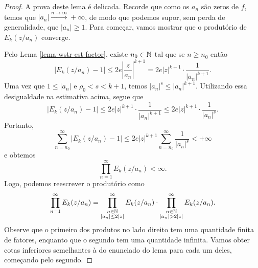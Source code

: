     \begin{proof}
        A prova deste lema é delicada. Recorde que como os $a_n$ são
        zeros de $f$, temos que $|a_n| \xrightarrow{n\to\infty} +\infty$,
        de modo que podemos supor, sem perda de generalidade, que $|a_n| \geq 1$.
        Para começar, vamos mostrar que o produtório de $E_k(z/a_n)$ converge.
        
        Pelo Lema \ref{lema-wstr-est-factor}, existe $n_0\in\mathbb{N}$ tal que se $n\geq n_0$
        então
        \begin{equation*}
            \left| E_k(z/a_n) - 1 \right| 
            \leq 2e\left| \frac{z}{a_n} \right|^{k+1}
            = 2e|z|^{k+1}\cdot\frac{1}{|a_n|^{k+1}}.
        \end{equation*}
        Uma vez que $1 \leq |a_n|$ e $\rho_0 < s < k+1$, temos 
        $|a_n|^s \leq |a_n|^{k+1}$. Utilizando essa desigualdade na estimativa acima,
        segue que
        \begin{equation*}
            \left| E_k(z/a_n) - 1 \right|
            \leq 2e|z|^{k+1}\cdot\frac{1}{|a_n|^{k+1}}
            \leq 2e|z|^{k+1}\cdot\frac{1}{|a_n|^s}.
        \end{equation*}
        Portanto,
        \begin{equation*}
            \sum_{n=n_0}^{\infty} \left| E_k(z/a_n) - 1 \right|
            \leq 2e|z|^{k+1} \sum_{n=n_0}^{\infty} \frac{1}{|a_n|^s} < +\infty
        \end{equation*}
        e obtemos
        \begin{equation*}
            \prod_{n=1}^{\infty} E_k(z/a_n) < \infty.
        \end{equation*}
        Logo, podemos reescrever o produtório como
        \begin{equation*}
            \prod_{n=1}^{\infty} E_k(z/a_n)
            = \prod_{\substack{n\in\mathbb{N} \\ |a_n| \leq 2|z|}}^{\infty} E_k(z/a_n) \cdot 
            \prod_{\substack{n\in\mathbb{N} \\ |a_n| > 2|z|}}^{\infty} E_k(z/a_n).
        \end{equation*}
        Observe que o primeiro dos produtos no lado direito tem uma quantidade finita
        de fatores, enquanto que o segundo tem uma quantidade infinita. Vamos obter
        cotas inferiores semelhantes à do enunciado do lema para cada um deles,
        começando pelo segundo.
        

\end{proof}

